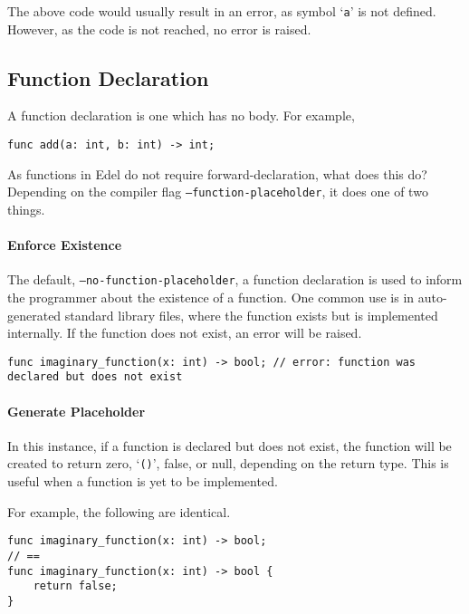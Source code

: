 The above code would usually result in an error, as symbol `\texttt{a}' is not defined.
However, as the code is not reached, no error is raised.

\subsection{Function Declaration}\label{subsec:function-declaration}

A function declaration is one which has no body.
For example,

\begin{lstlisting}[language=CustomLang]
func add(a: int, b: int) -> int;
\end{lstlisting}

As functions in Edel do not require forward-declaration, what does this do?
Depending on the compiler flag \texttt{--function-placeholder}, it does one of two things.

\paragraph*{Enforce Existence}

The default, \texttt{--no-function-placeholder}, a function declaration is used to inform the programmer about the existence of a function.
One common use is in auto-generated standard library files, where the function exists but is implemented internally.
If the function does not exist, an error will be raised.

\begin{lstlisting}[language=CustomLang]
func imaginary_function(x: int) -> bool; // error: function was declared but does not exist
\end{lstlisting}

\paragraph*{Generate Placeholder}

In this instance, if a function is declared but does not exist, the function will be created to return zero, `\texttt{()}', false, or null, depending on the return type.
This is useful when a function is yet to be implemented.

For example, the following are identical.
\begin{lstlisting}[language=CustomLang]
func imaginary_function(x: int) -> bool;
// ==
func imaginary_function(x: int) -> bool {
    return false;
}
\end{lstlisting}


